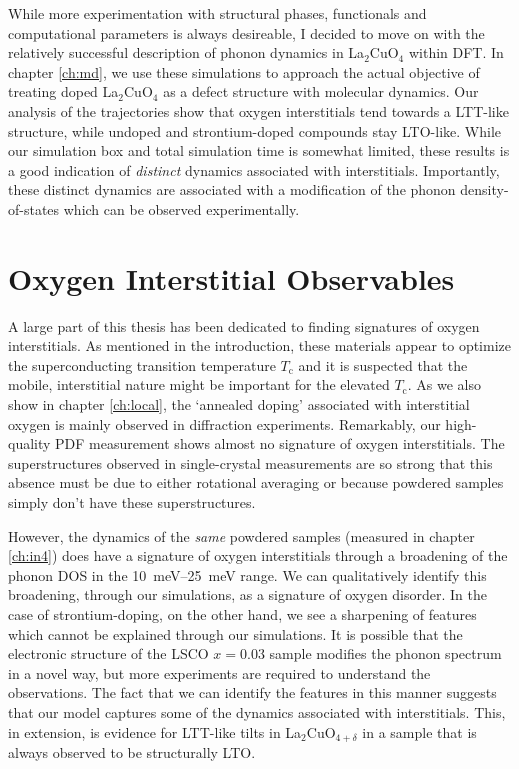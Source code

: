 While more experimentation with structural phases, functionals and computational parameters is always desireable, I decided to move on with the relatively successful description of phonon dynamics in La$_2$CuO$_4$ within DFT. In chapter \ref{ch:md}, we use these simulations to approach the actual objective of treating doped La$_2$CuO$_4$ as a defect structure with molecular dynamics. Our analysis of the trajectories show that oxygen interstitials tend towards a LTT-like structure, while undoped and strontium-doped compounds stay LTO-like. While our simulation box and total simulation time is somewhat limited, these results is a good indication of \emph{distinct} dynamics associated with interstitials. Importantly, these distinct dynamics are associated with a modification of the phonon density-of-states which can be observed experimentally.

\section{Oxygen Interstitial Observables}
A large part of this thesis has been dedicated to finding signatures of oxygen interstitials. As mentioned in the introduction, these materials appear to optimize the superconducting transition temperature $T_\text{c}$ and it is suspected that the mobile, interstitial nature might be important for the elevated $T_\text{c}$. As we also show in chapter \ref{ch:local}, the `annealed doping' \cite{Wells1997} associated with interstitial oxygen is mainly observed in diffraction experiments. Remarkably, our high-quality PDF measurement shows almost no signature of oxygen interstitials. The superstructures observed in single-crystal measurements are so strong that this absence must be due to either rotational averaging or because powdered samples simply don't have these superstructures.

However, the dynamics of the \emph{same} powdered samples (measured in chapter \ref{ch:in4}) does have a signature of oxygen interstitials through a broadening of the phonon DOS in the \SIrange{10}{25}{\milli\eV} range. We can qualitatively identify this broadening, through our simulations, as a signature of oxygen disorder. In the case of strontium-doping, on the other hand, we see a sharpening of features which cannot be explained through our simulations. It is possible that the electronic structure of the LSCO $x=0.03$ sample modifies the phonon spectrum in a novel way, but more experiments are required to understand the observations. The fact that we can identify the features in this manner suggests that our model captures some of the dynamics associated with interstitials. This, in extension, is evidence for LTT-like tilts in La$_2$CuO$_{4+\delta}$ in a sample that is always observed to be structurally LTO.

